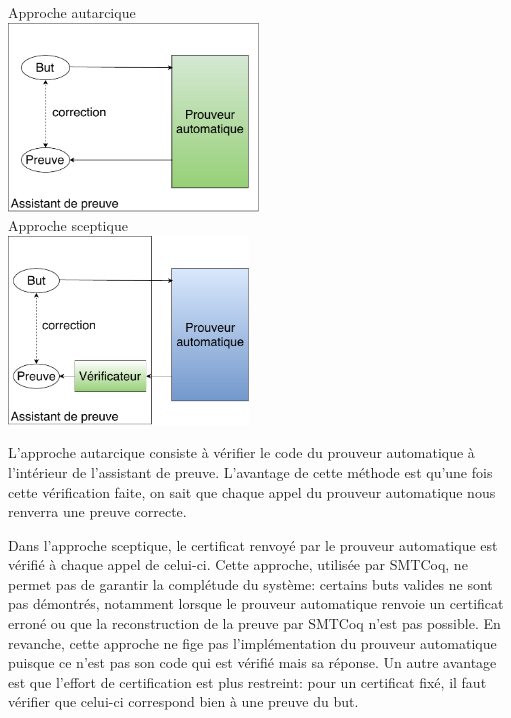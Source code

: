 \documentclass[11pt]{article}
\begin{document}
\begin{multicols}{2}
\begin{center}
Approche autarcique\\
\includegraphics[height=5cm]{1_Autarcique.pdf}\\
Approche sceptique\\
\includegraphics[height=5cm]{2_Sceptique.pdf}\\

\end{center}
\end{multicols}

L'approche autarcique consiste à vérifier le code du prouveur automatique à l'intérieur de l'assistant de preuve. L'avantage de cette méthode est qu'une fois cette vérification faite, on sait que chaque appel du prouveur automatique nous renverra une preuve correcte. \medbreak

Dans l'approche sceptique, le certificat renvoyé par le prouveur automatique est vérifié à chaque appel de celui-ci. Cette approche, utilisée par SMTCoq, ne permet pas de garantir la complétude du système: certains buts valides ne sont pas démontrés, notamment lorsque le prouveur automatique renvoie un certificat erroné ou que la reconstruction de la preuve par SMTCoq n'est pas possible. En revanche, cette approche ne fige pas l'implémentation du prouveur automatique puisque ce n'est pas son code qui est vérifié mais sa réponse. Un autre avantage est que l'effort de certification est plus restreint: pour un certificat fixé, il faut vérifier que celui-ci correspond bien à une preuve du but.
\end{document}
